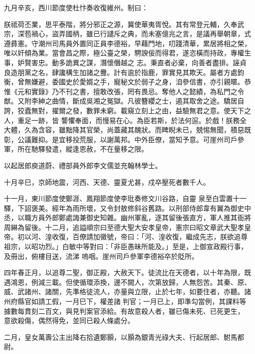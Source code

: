 \begin{pinyinscope}
 九月辛亥，西川節度使杜忭奏收復維州。制曰：



 朕祗荷丕業，思平泰階，將分邪正之源，冀使華夷胥悅。其有常登元輔，久奉武宗，深苞禍心，盜弄國柄，雖已行譴斥之典，而未塞億兆之言，是議再舉朝章，式遵彞憲。守潮州司馬員外置同正員李德裕，早藉門地，叨踐清華，累居將相之榮，唯以奸傾為業。當會昌之際，極公臺之榮，騁諛佞而得君，遂恣橫而持政，專權生事，妒賢害忠。動多詭異之謀，潛懷僭越之
 志。秉直者必棄，向善者盡排。誣貞良造朋黨之名，肆讒構生加諸之釁。計有逾於指鹿，罪實見其欺天。屬者方處鈞衡，曾無嫌避，委國史於愛婿之手，寵秘文於弱子之身，洎參信書，亦引親暱。恭惟《元和實錄》乃不刊之書，擅敢改張，罔有畏忌。奪他人之懿績，為私門之令猷。又附李紳之曲情，斷成吳湘之冤獄。凡彼簪纓之士，遏其取舍之途。驕居自誇，狡蠹無對，擢爾之發，數罪未窮。載窺立刻上之由，益驗無君之意。使天下之人，重足一跡，皆
 讋懼奉面，而慢易在心。為臣若斯，於法何逭。於戲！朕務全大體，久為含容，雖黜降其官榮，尚蓋藏其醜狀。而睥睨未已，兢惕無聞，積惡既彰，公議難抑。是宜移投荒服，以謝萬邦。中外臣僚，當知予意。可崖州司戶參軍，所在馳驛發遣，縱逢恩赦，不在量移之限。



 以起居郎庾道蔚、禮部員外郎李文儒並充翰林學士。



 十月辛巳，京師地震，河西、天德、靈夏尤甚，戍卒壓死者數千人。



 十一月，東川節度使鄭涯、鳳翔節度使李玭奏修文川谷路，自靈
 泉至白雲置十一驛，下詔褒美。經年為雨所壞，又令封敖修斜谷舊路。以刑部侍郎韋有翼為御史中丞，以職方員外郎鄭處誨兼御史知雜。幽州軍亂，逐其留後張直方，軍人推其衙將周綝為留後。十二月，追謚順宗曰至德大聖大安孝皇帝，憲宗曰昭文章武大聖孝皇帝。初以河、湟收復，百僚請加徽號，帝曰：「河、湟收復，繼成先志，朕欲追尊祖宗，以昭功烈。」白敏中等對曰：「非臣愚昧所能及。」至是，上御宣政殿行事，及冊出，俯樓目送，流涕
 嗚咽。崖州司戶參軍李德裕卒於貶所。



 四年春正月，以追尊二聖，御正殿，大赦天下。徒流比在天德者，以十年為限，既遇鴻恩，例減三載。但使循環添換，邊不闕人，次第放歸，人無怨苦。其秦、原、威、武諸州、諸關，先準格徒流人，亦量與立限，止於七年，如要住者，亦聽。諸州府縣官如請工假，一月巳下，權差諸判官；一月已上，即準勾當例，其課料等據數每貫刻二百文，與見判案官添給。有故意殺人者，雖已傷未死、已死更生，
 意欲殺傷，偶然得免，並同已殺人條處分。



 二月，皇女萬壽公主出降右拾遺鄭顥，以顥為銀青光祿大夫、行起居郎、駙馬都尉。




\end{pinyinscope}
